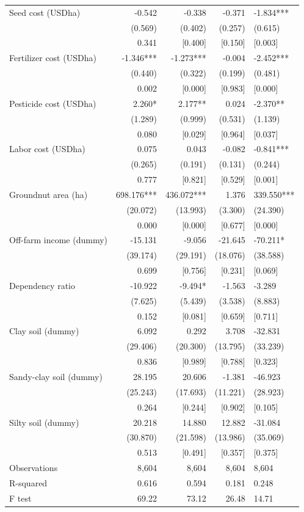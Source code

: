 \documentclass[
]{article}
\begin{document}
\begin{ThreePartTable}
\begin{longtable}[t]{lrrrl}
Seed cost (USD\/ha) & -0.542 & -0.338 & -0.371 & -1.834***\\
 & (0.569) & (0.402) & (0.257) & (0.615)\\
 & 0.341 & {}[0.400] & {}[0.150] & {}[0.003]\\
Fertilizer cost (USD\/ha) & -1.346*** & -1.273*** & -0.004 & -2.452***\\
 & (0.440) & (0.322) & (0.199) & (0.481)\\
 & 0.002 & {}[0.000] & {}[0.983] & {}[0.000]\\
Pesticide cost (USD\/ha) & 2.260* & 2.177** & 0.024 & -2.370**\\
 & (1.289) & (0.999) & (0.531) & (1.139)\\
 & 0.080 & {}[0.029] & {}[0.964] & {}[0.037]\\
Labor cost (USD\/ha) & 0.075 & 0.043 & -0.082 & -0.841***\\
 & (0.265) & (0.191) & (0.131) & (0.244)\\
 & 0.777 & {}[0.821] & {}[0.529] & {}[0.001]\\
Groundnut area (ha) & 698.176*** & 436.072*** & 1.376 & 339.550***\\
 & (20.072) & (13.993) & (3.300) & (24.390)\\
 & 0.000 & {}[0.000] & {}[0.677] & {}[0.000]\\
Off-farm income (dummy) & -15.131 & -9.056 & -21.645 & -70.211*\\
 & (39.174) & (29.191) & (18.076) & (38.588)\\
 & 0.699 & {}[0.756] & {}[0.231] & {}[0.069]\\
Dependency ratio & -10.922 & -9.494* & -1.563 & -3.289\\
 & (7.625) & (5.439) & (3.538) & (8.883)\\
 & 0.152 & {}[0.081] & {}[0.659] & {}[0.711]\\
Clay soil (dummy) & 6.092 & 0.292 & 3.708 & -32.831\\
 & (29.406) & (20.300) & (13.795) & (33.239)\\
 & 0.836 & {}[0.989] & {}[0.788] & {}[0.323]\\
Sandy-clay soil (dummy) & 28.195 & 20.606 & -1.381 & -46.923\\
 & (25.243) & (17.693) & (11.221) & (28.923)\\
 & 0.264 & {}[0.244] & {}[0.902] & {}[0.105]\\
Silty soil (dummy) & 20.218 & 14.880 & 12.882 & -31.084\\
 & (30.870) & (21.598) & (13.986) & (35.069)\\
 & 0.513 & {}[0.491] & {}[0.357] & {}[0.375]\\
Observations & 8,604 & 8,604 & 8,604 & 8,604\\
R-squared & 0.616 & 0.594 & 0.181 & 0.248\\
F test & 69.22 & 73.12 & 26.48 & 14.71\\*
\end{longtable}
\end{ThreePartTable}
\endgroup{}
\end{document}
